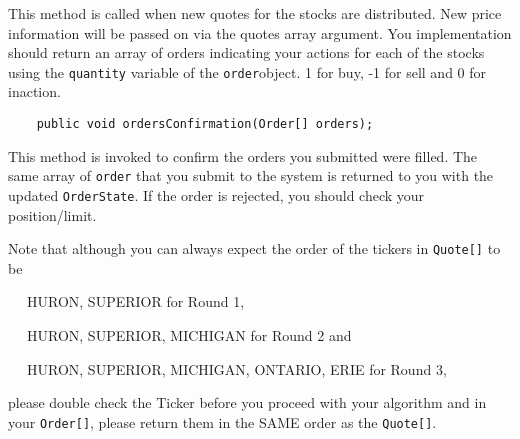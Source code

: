 \documentclass{amsart}
\renewcommand{\_}[1]{\underline{ #1 }}
\theoremstyle{definition}
\numberwithin{equation}{subsection}
\begin{document}
This method is called when new quotes for the stocks are distributed. New price information will be passed on via the quotes array argument. You implementation should return an array of orders indicating your actions for each of the stocks using the \verb+quantity+ variable of the \verb+order+object. 1 for buy, -1 for sell and 0 for inaction.  

\begin{verbatim}
    public void ordersConfirmation(Order[] orders);
\end{verbatim}

This method is invoked to confirm the orders you submitted were filled. The same array of \verb+order+ that you submit to the system is returned to you with the updated \verb+OrderState+. If the order is rejected, you should check your position/limit.

Note that although you can always expect the order of the tickers in \verb+Quote[]+ to be 

\verb+  + HURON, SUPERIOR for Round 1,

\verb+  + HURON, SUPERIOR, MICHIGAN for Round 2 and

\verb+  + HURON, SUPERIOR, MICHIGAN, ONTARIO, ERIE for Round 3,

please double check the Ticker before you proceed with your algorithm and in your \verb+Order[]+, please return them in the SAME order as the \verb+Quote[]+. 
 
\end{document}
